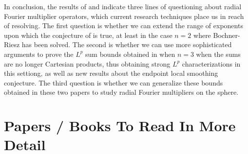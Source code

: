 In conclusion, the results of \cite{HeoandNazarovandSeeger} and \cite{Cladek} indicate three lines of questioning about radial Fourier multiplier operators, which current research techniques place us in reach of resolving. The first question is whether we can extend the range of exponents upon which the conjecture of \cite{GarrigosandSeeger} is true, at least in the case $n = 2$ where Bochner-Riesz has been solved. The second is whether we can use more sophisticated arguments to prove the $L^p$ sum bounds obtained in \cite{Cladek} when $n = 3$ when the sums are no longer Cartesian products, thus obtaining strong $L^p$ characterizations in this settiong, as well as new results about the endpoint local smoothing conjecture. The third question is whether we can generalize these bounds obtained in these two papers to study radial Fourier multipliers on the sphere. 

\chapter{Papers / Books To Read In More Detail}

